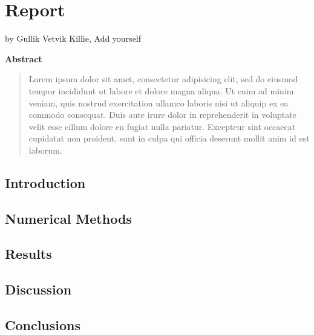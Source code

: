 \documentclass[captions=tableheading,twoside]{scrbook}
\newcommand{\agfauthor}[1]{%
	\begin{center}by #1\end{center}}
\newenvironment{Abstract}{\begin{center}\textbf{Abstract}\end{center}%
	\begin{quote}}{\end{quote}}
\begin{document}
\chapter{Report}
\agfauthor{Gullik Vetvik Killie, \large{Add yourself}}

\begin{Abstract}
	Lorem ipsum dolor sit amet, consectetur adipisicing elit, sed do eiusmod
	tempor incididunt ut labore et dolore magna aliqua. Ut enim ad minim veniam,
	quis nostrud exercitation ullamco laboris nisi ut aliquip ex ea commodo consequat.
 	Duis aute irure dolor in reprehenderit in voluptate velit esse cillum dolore eu
	fugiat nulla pariatur. Excepteur sint occaecat cupidatat non proident, sunt in
	culpa qui officia deserunt mollit anim id est laborum.
\end{Abstract}

\section{Introduction}


\section{Numerical Methods}


\section{Results}


\section{Discussion}



\section{Conclusions}



\nocite{*}


\end{document}
